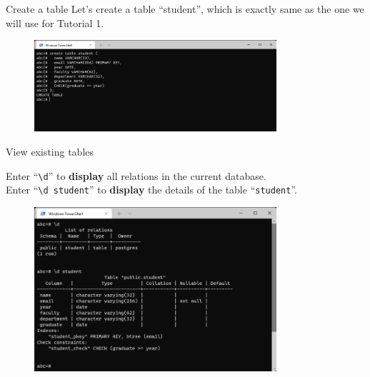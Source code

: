 \begin{frame}[fragile]{Create a table}
	Let's create a table ``student'', which is exactly same as the one we will use for Tutorial 1.
	\begin{figure}
		\includegraphics[width=0.8\textwidth]{t0-psql/images/5.png}
	\end{figure}
	
\end{frame}

\begin{frame}[fragile]{View existing tables}
	
	Enter ``\texttt{\textbackslash d}'' to \textbf{display} all relations in the current database.\\
	Enter ``\texttt{\textbackslash d student}'' to \textbf{display} the details of the table ``\texttt{student}''.
	\begin{figure}
		\includegraphics[width=0.8\textwidth]{t0-psql/images/6.png}
	\end{figure}
		
\end{frame}

